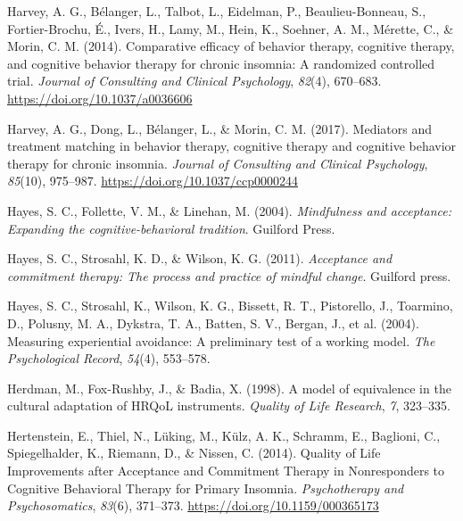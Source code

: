 \documentclass[
  ,doc,11pt, twoside,floatsintext]{apa6}
\newlength{\cslhangindent}
\newlength{\cslentryspacingunit} %
\newenvironment{CSLReferences}[2] %
 {%
  \setlength{\parindent}{0pt}
  \ifodd #1
  \let\oldpar\par
  \def\par{\hangindent=\cslhangindent\oldpar}
  \fi
  \setlength{\parskip}{#2\cslentryspacingunit}
 }%
 {}
\begin{document}
\begin{CSLReferences}{1}{0}
\leavevmode{}%
Harvey, A. G., Bélanger, L., Talbot, L., Eidelman, P., Beaulieu-Bonneau, S., Fortier-Brochu, É., Ivers, H., Lamy, M., Hein, K., Soehner, A. M., Mérette, C., \& Morin, C. M. (2014). Comparative efficacy of behavior therapy, cognitive therapy, and cognitive behavior therapy for chronic insomnia: A randomized controlled trial. \emph{Journal of Consulting and Clinical Psychology}, \emph{82}(4), 670--683. \url{https://doi.org/10.1037/a0036606}

\leavevmode{}%
Harvey, A. G., Dong, L., Bélanger, L., \& Morin, C. M. (2017). Mediators and treatment matching in behavior therapy, cognitive therapy and cognitive behavior therapy for chronic insomnia. \emph{Journal of Consulting and Clinical Psychology}, \emph{85}(10), 975--987. \url{https://doi.org/10.1037/ccp0000244}

\leavevmode{}%
Hayes, S. C., Follette, V. M., \& Linehan, M. (2004). \emph{Mindfulness and acceptance: Expanding the cognitive-behavioral tradition}. Guilford Press.

\leavevmode{}%
Hayes, S. C., Strosahl, K. D., \& Wilson, K. G. (2011). \emph{Acceptance and commitment therapy: The process and practice of mindful change}. Guilford press.

\leavevmode{}%
Hayes, S. C., Strosahl, K., Wilson, K. G., Bissett, R. T., Pistorello, J., Toarmino, D., Polusny, M. A., Dykstra, T. A., Batten, S. V., Bergan, J., et al. (2004). Measuring experiential avoidance: A preliminary test of a working model. \emph{The Psychological Record}, \emph{54}(4), 553--578.

\leavevmode{}%
Herdman, M., Fox-Rushby, J., \& Badia, X. (1998). A model of equivalence in the cultural adaptation of {HRQoL} instruments. \emph{Quality of Life Research}, \emph{7}, 323--335.

\leavevmode{}%
Hertenstein, E., Thiel, N., Lüking, M., Külz, A. K., Schramm, E., Baglioni, C., Spiegelhalder, K., Riemann, D., \& Nissen, C. (2014). Quality of {Life Improvements} after {Acceptance} and {Commitment Therapy} in {Nonresponders} to {Cognitive Behavioral Therapy} for {Primary Insomnia}. \emph{Psychotherapy and Psychosomatics}, \emph{83}(6), 371--373. \url{https://doi.org/10.1159/000365173}


\end{CSLReferences}
\end{document}
